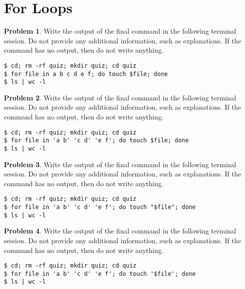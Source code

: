 \documentclass[10pt]{article}
\theoremstyle{definition}
\newtheorem{problem}{Problem}
\begin{document}
\section{For Loops}

\begin{samepage}
\begin{problem}
Write the output of the final command in the following terminal session.
Do not provide any additional information,
such as explanations.
If the command has no output,
then do not write anything.

\end{problem}
\begin{lstlisting}
$ cd; rm -rf quiz; mkdir quiz; cd quiz
$ for file in a b c d e f; do touch $file; done
$ ls | wc -l
\end{lstlisting}
\end{samepage}


\begin{samepage}
\begin{problem}
Write the output of the final command in the following terminal session.
Do not provide any additional information,
such as explanations.
If the command has no output,
then do not write anything.

\end{problem}
\begin{lstlisting}
$ cd; rm -rf quiz; mkdir quiz; cd quiz
$ for file in 'a b' 'c d' 'e f'; do touch $file; done
$ ls | wc -l
\end{lstlisting}
\end{samepage}


\begin{samepage}
\begin{problem}
Write the output of the final command in the following terminal session.
Do not provide any additional information,
such as explanations.
If the command has no output,
then do not write anything.

\end{problem}
\begin{lstlisting}
$ cd; rm -rf quiz; mkdir quiz; cd quiz
$ for file in 'a b' 'c d' 'e f'; do touch "$file"; done
$ ls | wc -l
\end{lstlisting}
\end{samepage}


\begin{samepage}
\begin{problem}
Write the output of the final command in the following terminal session.
Do not provide any additional information,
such as explanations.
If the command has no output,
then do not write anything.

\end{problem}
\begin{lstlisting}
$ cd; rm -rf quiz; mkdir quiz; cd quiz
$ for file in 'a b' 'c d' 'e f'; do touch '$file'; done
$ ls | wc -l
\end{lstlisting}
\end{samepage}
\end{document}

